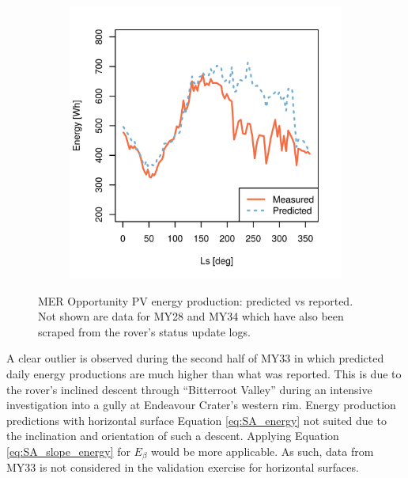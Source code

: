 \begin{figure}[h]
\begin{subfigure}[t]{\subfigureWidth}
  		\label{fig:plot:sub:mer-energy-production-predicted-vs-reported-my32}
  	\end{subfigure}\hfill
	   \begin{subfigure}[t]{\subfigureWidth}
      \centering
  		\includegraphics[height=\graphicsHeight]{sections/mars-solar-energy/photovoltaic-energy/plots/predicted-vs-measured-energy-my33.png}
  		\label{fig:plot:sub:mer-energy-production-predicted-vs-reported-my33}
	   \end{subfigure}\hfill
    \caption[MER Opportunity PV energy production: predicted vs reported]
            {MER Opportunity PV energy production: predicted vs reported. Not shown are data for MY28 and MY34 which have also been scraped from the rover's status update logs.}
	\label{fig:plot:mer-energy-production-predicted-vs-reported}
\vspace{-2ex}
\end{figure}

\clearpage

A clear outlier is observed during the second half of MY33 in which predicted daily energy productions are much higher than what was reported. This is due to the rover's inclined descent through ``Bitterroot Valley'' during an intensive investigation into a gully at Endeavour Crater's western rim. Energy production predictions with horizontal surface Equation \ref{eq:SA_energy} not suited due to the inclination and orientation of such a descent. Applying Equation \ref{eq:SA_slope_energy} for $E_{\beta}$ would be more applicable. As such, data from MY33 is not considered in the validation exercise for horizontal surfaces.

